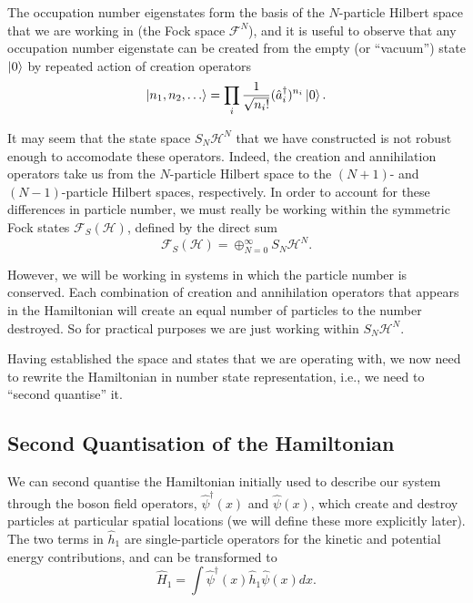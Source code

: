 \documentclass[a4paper,10pt]{article}
\begin{document}
The occupation number eigenstates form the basis of the $N$-particle Hilbert space that we are working in (the Fock space $\mathcal{F}^N$), and it 
is useful to observe that any occupation number eigenstate can be created from the empty (or ``vacuum'') state $\ket{0}$ by repeated action of 
creation operators \cite{Altland2010}
\begin{equation}
 \ket{n_1,n_2,\dots}=\prod_i\frac{1}{\sqrt{n_i!}}(\hat{a}_i^{\dagger})^{n_i}\ket{0}.
\end{equation}

It may seem that the state space $S_N\mathcal{H}^N$ that we have constructed is not robust enough to accomodate these operators. Indeed, the creation and
annihilation operators take us from the $N$-particle Hilbert space to the $(N+1)$- and $(N-1)$-particle Hilbert spaces, respectively. In order to
account for these differences in particle number, we must really be working within the symmetric Fock states $\mathcal{F}_S(\mathcal{H})$, defined by the direct sum \cite{Blank1999}
\begin{equation}
 \mathcal{F}_S(\mathcal{H})=\oplus_{N=0}^\infty S_N\mathcal{H}^N.
\end{equation}

However, we will be working in systems in which the particle number is conserved. Each combination of creation and annihilation operators that appears in the Hamiltonian
will create an equal number of particles to the number destroyed. So for practical purposes we are just working within $S_N\mathcal{H}^N$.

Having established the space and states that we are operating with, we now need to rewrite the Hamiltonian in number state representation, i.e., we need to
``second quantise'' it. 

\subsection{Second Quantisation of the Hamiltonian}
We can second quantise the Hamiltonian initially used to describe our system through the boson field operators, $\hat{\psi}^{\dagger}(x)$ and $\hat{\psi}(x)$, which create and destroy 
particles at particular spatial locations (we will define these more explicitly later). The two terms in $\hat{h}_1$ are single-particle
operators for the kinetic and potential energy contributions, and can be transformed to
\begin{equation}
 \hat{H}_1=\int  \hat{\psi}^{\dagger}(x) \hat{h}_1   \hat{\psi}(x)dx.
\end{equation}
\end{document}
